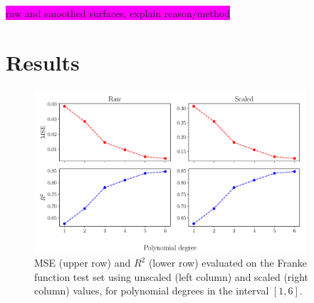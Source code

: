 \documentclass[aps,pra,english,notitlepage,reprint,nofootinbib]{revtex4-1}  %
\begin{document}
\colorbox{magenta}{raw and smoothed surfaces, explain reason/method}





\section{Results}\label{sec:results}

\begin{figure}
  \vspace*{-5pt}
  \centering %
  \includegraphics[width=0.9\textwidth]{../figs/a_error_scaled_vs_raw.pdf}
  \caption{MSE (upper row) and $R^2$ (lower row) evaluated on the Franke function test set using unscaled (left column) and scaled (right column) values, for polynomial degrees in the interval $[1,6]$.}\label{fig:a error scaled vs raw}
  \vspace*{-5pt}
\end{figure}
\end{document}

